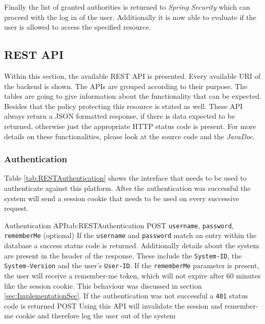 Finally the list of granted authorities is returned to \emph{Spring Security} which can proceed with the log in of the user. Additionally it is now able to evaluate if the user is allowed to access the specified resource.

\subsection{REST API}
\label{sec:REST}

Within this section, the available \gls{REST} \gls{API} is presented. Every available \gls{URI} of the backend is shown. The \gls{API}s are grouped according to their purpose. The tables are going to give information about the functionality that can be expected. Besides that the policy protecting this resource is stated as well. These \gls{API} always return a \gls{JSON} formatted response, if there is data expected to be returned, otherwise just the appropriate HTTP status code is present. For more details on these functionalities, please look at the source code and the \emph{JavaDoc}.

\subsubsection{Authentication}

Table \vref{tab:RESTAuthentication} shows the interface that needs to be used to authenticate against this platform. After the authentication was successful the system will send a session cookie that needs to be used on every successive request.

\begin{RESTTable}{Authentication API}{tab:RESTAuthentication}
		{POST}
		{\texttt{username}, \texttt{password}, \texttt{rememberMe} (optional)}
		{If the \texttt{username} and \texttt{password} match an entry within the database a success status code is returned. Additionally details about the system are present in the header of the response. These include the \texttt{System-ID}, the \texttt{System-Version} and the user's \texttt{User-ID}. If the \texttt{rememberMe} parameter is present, the user will receive a remember-me token, which will not expire after 60 minutes like the session cookie. This behaviour was discussed in section \vref{sec:ImplementationSec}. If the authentication was not successful a \texttt{401} status code is returned}
		{POST}
		{}
		{Using this \gls{API} will invalidate the session and remember-me cookie and therefore log the user out of the system}
\end{RESTTable}



